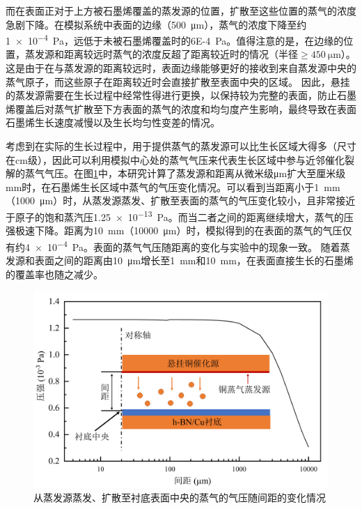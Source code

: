     而在表面正对于上方被石墨烯覆盖的蒸发源的位置，扩散至这些位置的蒸气的浓度急剧下降。在模拟系统中表面的边缘（\SI{500}{\micro\meter}），蒸气的浓度下降至约\SI{1e-4}{\pascal}，远低于未被石墨烯覆盖时的\SI{6E-4}{\pascal}。值得注意的是，在边缘的位置，蒸发源和距离较远时蒸气的浓度反超了距离较近时的情况（半径$\geqslant \SI{450}{\micro\meter}$）。这是由于在与蒸发源的距离较远时，表面边缘能够更好的接收到来自蒸发源中央的蒸气原子，而这些原子在距离较近时会直接扩散至表面中央的区域。
    因此，悬挂的蒸发源需要在生长过程中经常性得进行更换，以保持较为完整的表面，防止石墨烯覆盖后对蒸气扩散至下方表面的蒸气的浓度和均匀度产生影响，最终导致在表面石墨烯生长速度减慢以及生长均匀性变差的情况。

    考虑到在实际的生长过程中，用于提供蒸气的蒸发源可以比生长区域大得多（尺寸在\si{\centi\meter}级），因此可以利用模拟中心处的蒸气气压来代表生长区域中参与近邻催化裂解的蒸气气压。在图\ref{fig:CG_FEM_fullCuCenterVariousDistance}中，本研究计算了蒸发源和距离从微米级\si{\micro\meter}扩大至厘米级\si{\milli\meter}时，在石墨烯生长区域中蒸气的气压变化情况。可以看到当距离小于\SI{1}{\milli\meter}（\SI{1000}{\micro\meter}）时，从蒸发源蒸发、扩散至表面的蒸气的气压变化较小，且非常接近于原子的饱和蒸汽压\SI{1.25e-13}{\pascal}。而当二者之间的距离继续增大，蒸气的压强极速下降。距离为\SI{10}{\milli\meter}（\SI{10000}{\micro\meter}）时，模拟得到的在表面的蒸气的气压仅有约\SI{4e-4}{\pascal}。表面的蒸气气压随距离的变化与实验中的现象一致。
    随着蒸发源和表面之间的距离由\SI{10}{\micro\meter}增长至\SI{1}{\milli\meter}和\SI{10}{\milli\meter}，在表面直接生长的石墨烯的覆盖率也随之减少。

    \begin{figure}[htb]
        \includegraphics{pic/CG_FEM_fullCuCenterVariousDistance.png}
        \caption{从蒸发源蒸发、扩散至衬底表面中央的蒸气的气压随间距的变化情况}
        \label{fig:CG_FEM_fullCuCenterVariousDistance}
    \end{figure}

